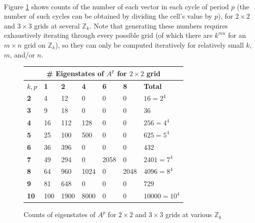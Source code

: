 \documentclass[11pt]{article}
\newcommand{\modZ}[1]{$\mathbb{Z}_{#1}$}
\begin{document}
\paragraph{} Figure \ref{eigencounts} shows counts of the number of each vector in each cycle of period $p$ (the number of such cycles can be obtained by dividing the cell's value by $p$), for $2 \times 2$ and $3 \times 3$ grids at several \modZ{k}. Note that generating these numbers requires exhaustively iterating through every possible grid (of which there are $k^{mn}$ for an $m \times n$ grid on \modZ{k}), so they can only be computed iteratively for relatively small $k$, $m$, and/or $n$.

\begin{figure}[H]
  \caption{Counts of eigenstates of $A^p$ for $2 \times 2$ and $3 \times 3$ grids at various \modZ{k}}
  \label{eigencounts}

  \begin{center}
  \begin{tabular}{|l|l|l|l|l|l|l|}
    \hline
    \multicolumn{7}{|c|}{\# Eigenstates of $A^p$ for $2 \times 2$ grid} \\ \hline
    $k, p$&\textbf{1}&\textbf{2}&\textbf{4}&\textbf{6}&\textbf{8}&\textbf{Total}\\ \hline
    \textbf{2}  & 4   & 12   & 0    & 0    & 0    & $16=2^4$ \\ \hline
    \textbf{3}  & 9   & 18   & 0    & 0    & 0    & $36$ \\ \hline
    \textbf{4}  & 16  & 112  & 128  & 0    & 0    & $256=4^4$ \\ \hline
    \textbf{5}  & 25  & 100  & 500  & 0    & 0    & $625=5^4$ \\ \hline
    \textbf{6}  & 36  & 396  & 0    & 0    & 0    & $432$ \\ \hline
    \textbf{7}  & 49  & 294  & 0    & 2058 & 0    & $2401=7^4$ \\ \hline
    \textbf{8}  & 64  & 960  & 1024 & 0    & 2048 & $4096=8^4$ \\ \hline
    \textbf{9}  & 81  & 648  & 0    & 0    & 0    & $729$ \\ \hline
    \textbf{10} & 100 & 1900 & 8000 & 0    & 0    & $10000=10^4$ \\ \hline
  \end{tabular}
  \vspace{0.5cm}


\end{center}
\end{figure}
\end{document}
